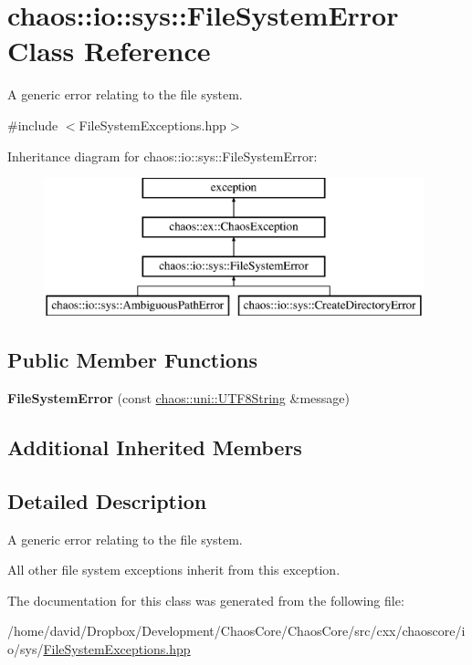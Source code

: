 \hypertarget{classchaos_1_1io_1_1sys_1_1_file_system_error}{\section{chaos\-:\-:io\-:\-:sys\-:\-:File\-System\-Error Class Reference}
\label{classchaos_1_1io_1_1sys_1_1_file_system_error}
}


A generic error relating to the file system.  




{\ttfamily \#include $<$File\-System\-Exceptions.\-hpp$>$}

Inheritance diagram for chaos\-:\-:io\-:\-:sys\-:\-:File\-System\-Error\-:\begin{figure}[H]
\begin{center}
\leavevmode
\includegraphics[height=4.000000cm]{classchaos_1_1io_1_1sys_1_1_file_system_error}
\end{center}
\end{figure}
\subsection*{Public Member Functions}
\begin{DoxyCompactItemize}
\item 
\hypertarget{classchaos_1_1io_1_1sys_1_1_file_system_error_a9da12ab81ffc6b146e6ac4bd60536bd2}{{\bfseries File\-System\-Error} (const \hyperlink{classchaos_1_1uni_1_1_u_t_f8_string}{chaos\-::uni\-::\-U\-T\-F8\-String} \&message)}\label{classchaos_1_1io_1_1sys_1_1_file_system_error_a9da12ab81ffc6b146e6ac4bd60536bd2}

\end{DoxyCompactItemize}
\subsection*{Additional Inherited Members}


\subsection{Detailed Description}
A generic error relating to the file system. 

All other file system exceptions inherit from this exception. 

The documentation for this class was generated from the following file\-:\begin{DoxyCompactItemize}
\item 
/home/david/\-Dropbox/\-Development/\-Chaos\-Core/\-Chaos\-Core/src/cxx/chaoscore/io/sys/\hyperlink{_file_system_exceptions_8hpp}{File\-System\-Exceptions.\-hpp}\end{DoxyCompactItemize}
